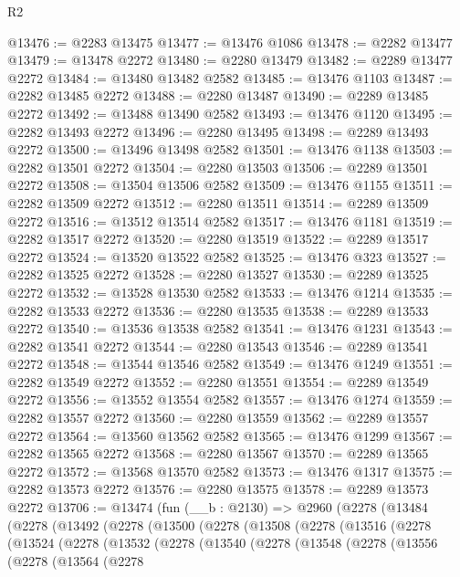 \begin{lexlean}{R2}
\begin{coremodule}
@13476 := @2283 @13475
@13477 := @13476 @1086
@13478 := @2282 @13477
@13479 := @13478 @2272
@13480 := @2280 @13479
@13482 := @2289 @13477 @2272
@13484 := @13480 @13482 @2582
@13485 := @13476 @1103
@13487 := @2282 @13485 @2272
@13488 := @2280 @13487
@13490 := @2289 @13485 @2272
@13492 := @13488 @13490 @2582
@13493 := @13476 @1120
@13495 := @2282 @13493 @2272
@13496 := @2280 @13495
@13498 := @2289 @13493 @2272
@13500 := @13496 @13498 @2582
@13501 := @13476 @1138
@13503 := @2282 @13501 @2272
@13504 := @2280 @13503
@13506 := @2289 @13501 @2272
@13508 := @13504 @13506 @2582
@13509 := @13476 @1155
@13511 := @2282 @13509 @2272
@13512 := @2280 @13511
@13514 := @2289 @13509 @2272
@13516 := @13512 @13514 @2582
@13517 := @13476 @1181
@13519 := @2282 @13517 @2272
@13520 := @2280 @13519
@13522 := @2289 @13517 @2272
@13524 := @13520 @13522 @2582
@13525 := @13476 @323
@13527 := @2282 @13525 @2272
@13528 := @2280 @13527
@13530 := @2289 @13525 @2272
@13532 := @13528 @13530 @2582
@13533 := @13476 @1214
@13535 := @2282 @13533 @2272
@13536 := @2280 @13535
@13538 := @2289 @13533 @2272
@13540 := @13536 @13538 @2582
@13541 := @13476 @1231
@13543 := @2282 @13541 @2272
@13544 := @2280 @13543
@13546 := @2289 @13541 @2272
@13548 := @13544 @13546 @2582
@13549 := @13476 @1249
@13551 := @2282 @13549 @2272
@13552 := @2280 @13551
@13554 := @2289 @13549 @2272
@13556 := @13552 @13554 @2582
@13557 := @13476 @1274
@13559 := @2282 @13557 @2272
@13560 := @2280 @13559
@13562 := @2289 @13557 @2272
@13564 := @13560 @13562 @2582
@13565 := @13476 @1299
@13567 := @2282 @13565 @2272
@13568 := @2280 @13567
@13570 := @2289 @13565 @2272
@13572 := @13568 @13570 @2582
@13573 := @13476 @1317
@13575 := @2282 @13573 @2272
@13576 := @2280 @13575
@13578 := @2289 @13573 @2272
@13706 := @13474
    (fun (__b : @2130) =>
    @2960
      (@2278
        (@13484
          (@2278
            (@13492
              (@2278
                (@13500
                  (@2278
                    (@13508
                      (@2278
                        (@13516
                          (@2278
                            (@13524
                              (@2278
                                (@13532
                                  (@2278
                                    (@13540
                                      (@2278
                                        (@13548
                                          (@2278
                                            (@13556
                                              (@2278
                                                (@13564
                                                  (@2278

\end{coremodule}
\end{lexlean}
